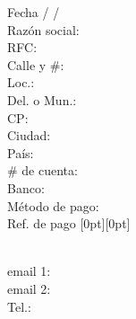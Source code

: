 \documentclass{article}
\newlength{\xorig}   \setlength{\xorig}{0cm}
\newlength{\yorig}   \setlength{\yorig}{0cm}
\begin{document}
\linespread{1.6}

\selectfont


\color{gris}



\begin{center}
	\begin{minipage}{0.4675\textwidth}
		Fecha \sout{\hfill\mbox{}} \hspace{1.25cm} / \hspace{1.25cm} / \hspace{1.25cm} \\
		Razón social: \uline{\hfill\mbox{}} \\
		RFC: \uline{\hfill\mbox{}} \\
		Calle y \#: \uline{\hfill\mbox{}} \\
		Loc.: \uline{\hfill\mbox{}} \\
		Del. o Mun.: \uline{\hfill\mbox{}} \\
		CP: \uline{\hfill\mbox{}} \\
		Ciudad: \uline{\hfill\mbox{}} \\
		País: \uline{\hfill\mbox{}} \\
		\# de cuenta: \uline{\hfill\mbox{}} \\
		Banco: \uline{\hfill\mbox{}} \\
		Método de pago: \uline{\hfill\mbox{}} \\
		Ref. de pago \sout{\hfill{}\mbox{}} \raisebox{-0.6em}[0pt][0pt]{
		}\\
		email 1: \uline{\hfill{}\mbox{}} \\
		email 2: \uline{\hfill{}\mbox{}} \\
		Tel.: \uline{\hfill{}\mbox{}}


\end{minipage}
\end{center}
\end{document}
